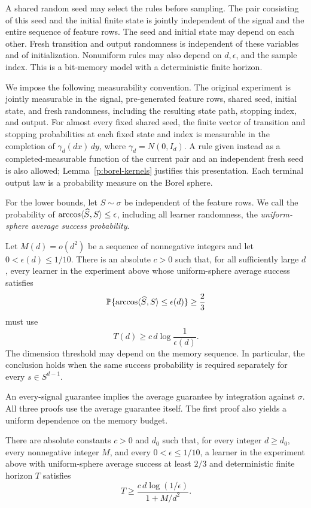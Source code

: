 A shared random seed may select the rules before sampling. The pair
consisting of this seed and the initial finite state is jointly independent
of the signal and the entire sequence of feature rows. The seed and initial
state may depend on each other. Fresh transition and output randomness is
independent of these variables and of initialization. Nonuniform rules may
also depend on \(d,\epsilon\), and the sample index. This is a bit-memory
model with a deterministic finite horizon.

We impose the following measurability convention. The original experiment
is jointly measurable in the signal, pre-generated feature rows, shared
seed, initial state, and fresh randomness, including the resulting state
path, stopping index, and output. For almost every fixed shared seed, the
finite vector of transition and stopping probabilities at each fixed
state and index is measurable in the completion of
\(\gamma_d(dx)\,dy\), where \(\gamma_d=N(0,I_d)\). A rule given instead
as a completed-measurable function of the current pair and an independent
fresh seed is also allowed; Lemma~\ref{p:borel-kernels} justifies this
presentation. Each terminal output law is a probability measure on the
Borel sphere.

For the lower bounds, let \(S\sim\sigma\) be independent of the feature
rows. We call the probability of
\(\arccos\langle \widehat S,S\rangle\le\epsilon\), including all learner
randomness, the \emph{uniform-sphere average success probability}.

\begin{theorem}\label{p:regression}
Let \(M(d)=o(d^2)\) be a sequence of nonnegative integers and let
\(0<\epsilon(d)\le1/10\). There is an absolute \(c>0\) such that, for
all sufficiently large \(d\), every learner in the experiment above whose
uniform-sphere average success satisfies
\[
 \mathbb P\{\arccos\langle \widehat S,S\rangle\le\epsilon(d)\}\ge\frac23
\]
must use
\[
 T(d)\ge c\,d\log\frac1{\epsilon(d)}.
\]
The dimension threshold may depend on the memory sequence. In particular,
the conclusion holds when the same success probability is required
separately for every \(s\in S^{d-1}\).
\end{theorem}

An every-signal guarantee implies the average guarantee by integration
against \(\sigma\). All three proofs use the average guarantee itself.
The first proof also yields a uniform dependence on the memory budget.

\begin{corollary}
\label{p:finite-memory-tradeoff}
There are absolute constants \(c>0\) and \(d_0\) such that, for every
integer \(d\ge d_0\), every nonnegative integer \(M\), and every
\(0<\epsilon\le1/10\), a learner in the experiment above with
uniform-sphere average success at least \(2/3\) and deterministic finite
horizon \(T\) satisfies
\[
 T\ge \frac{c\,d\log(1/\epsilon)}{1+M/d^2}.
\]
\end{corollary}

